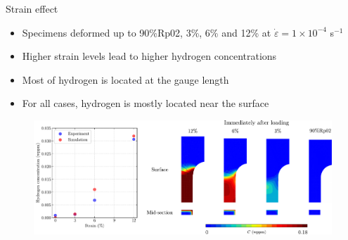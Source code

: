 \documentclass[9pt]{beamer}
\begin{document}

\begin{frame}{Strain effect}

\begin{itemize}
	\item Specimens deformed up to 90\%Rp02, 3\%, 6\% and 12\% at 
	$\dot{\varepsilon} = 1\times10^{-4}$ s$^{-1}$
	\vspace{0.15cm}
	\item Higher strain levels lead to higher hydrogen concentrations
	\vspace{0.15cm}
	\item Most of hydrogen is located at the gauge length
	\vspace{0.15cm}
	\item For all cases, hydrogen is mostly located near the surface
\end{itemize}

\vspace{0.15cm}

	\begin{figure}
		\centering
		\includegraphics[width=\textwidth]{Images/strain_effect.pdf} \\
	\end{figure}

\end{frame}

\end{document}
